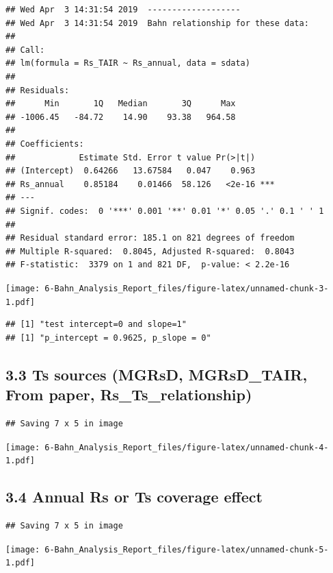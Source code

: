\documentclass[]{article}
\begin{document}
\begin{verbatim}
## Wed Apr  3 14:31:54 2019  -------------------
## Wed Apr  3 14:31:54 2019  Bahn relationship for these data:
## 
## Call:
## lm(formula = Rs_TAIR ~ Rs_annual, data = sdata)
## 
## Residuals:
##      Min       1Q   Median       3Q      Max 
## -1006.45   -84.72    14.90    93.38   964.58 
## 
## Coefficients:
##             Estimate Std. Error t value Pr(>|t|)    
## (Intercept)  0.64266   13.67584   0.047    0.963    
## Rs_annual    0.85184    0.01466  58.126   <2e-16 ***
## ---
## Signif. codes:  0 '***' 0.001 '**' 0.01 '*' 0.05 '.' 0.1 ' ' 1
## 
## Residual standard error: 185.1 on 821 degrees of freedom
## Multiple R-squared:  0.8045, Adjusted R-squared:  0.8043 
## F-statistic:  3379 on 1 and 821 DF,  p-value: < 2.2e-16
\end{verbatim}

\texttt{[image: 6-Bahn\_Analysis\_Report\_files/figure-latex/unnamed-chunk-3-1.pdf]}

\begin{verbatim}
## [1] "test intercept=0 and slope=1"
## [1] "p_intercept = 0.9625, p_slope = 0"
\end{verbatim}

\hypertarget{ts-sources-mgrsd-mgrsd_tair-from-paper-rs_ts_relationship}{%
\subsection{3.3 Ts sources (MGRsD, MGRsD\_TAIR, From paper,
Rs\_Ts\_relationship)}\label{ts-sources-mgrsd-mgrsd_tair-from-paper-rs_ts_relationship}}

\begin{verbatim}
## Saving 7 x 5 in image
\end{verbatim}

\texttt{[image: 6-Bahn\_Analysis\_Report\_files/figure-latex/unnamed-chunk-4-1.pdf]}

\hypertarget{annual-rs-or-ts-coverage-effect}{%
\subsection{3.4 Annual Rs or Ts coverage
effect}\label{annual-rs-or-ts-coverage-effect}}

\begin{verbatim}
## Saving 7 x 5 in image
\end{verbatim}

\texttt{[image: 6-Bahn\_Analysis\_Report\_files/figure-latex/unnamed-chunk-5-1.pdf]}
\end{document}
